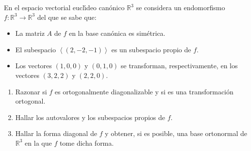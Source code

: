 \begin{enunciado}
 En el espacio vectorial eucl\'{\i}deo can\'onico $\mathbb{R}^3$ se considera un endomorfismo $f:\mathbb{R}^3 \to \mathbb{R}^3$ del que se sabe que:
 \begin{itemize}
  \item La matriz $A$ de $f$ en la base can\'onica es sim\'etrica.
  
  \item El subespacio $\left< (2, -2, -1) \right>$ es un subespacio propio de $f$.
  
  \item Los vectores $(1,0,0)$ y $(0,1,0)$ se transforman, respectivamente, en los vectores $(3,2,2)$ y $(2,2,0)$.
 \end{itemize}
 \begin{enumerate}[$a$)]
  \item Razonar si $f$ es ortogonalmente diagonalizable y si es una transformaci\'on ortogonal.
  
  \item Hallar los autovalores y los subespacios propios de $f$.
  
  \item Hallar la forma diagonal de $f$ y obtener, si es posible, una base ortonormal de $\mathbb{R}^3$ en la que $f$ tome dicha forma.
 \end{enumerate}
\end{enunciado}
 
